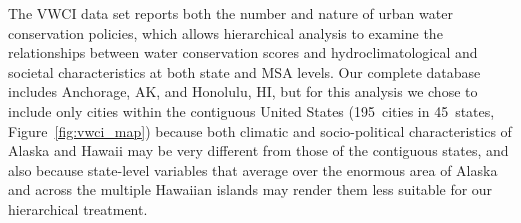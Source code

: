 \documentclass[draft,linenumbers]{agujournal}\usepackage{knitr}
\begin{document}
The VWCI data set reports both the number and
nature of urban water conservation policies, which  allows hierarchical analysis
to examine the relationships between water conservation scores and
hydroclimatological and societal characteristics at both state and MSA levels.
Our complete database includes Anchorage, AK, and Honolulu, HI, but for this
analysis we chose to include only cities within the contiguous United States
(195~cities in 45~states,
Figure~\ref{fig:vwci_map})
because both
climatic and socio-political characteristics of Alaska and Hawaii may be very
different from those of the contiguous states, and also because state-level
variables that average over the enormous area of Alaska and across the multiple
Hawaiian islands may render them less suitable for our hierarchical treatment.
\end{document}
